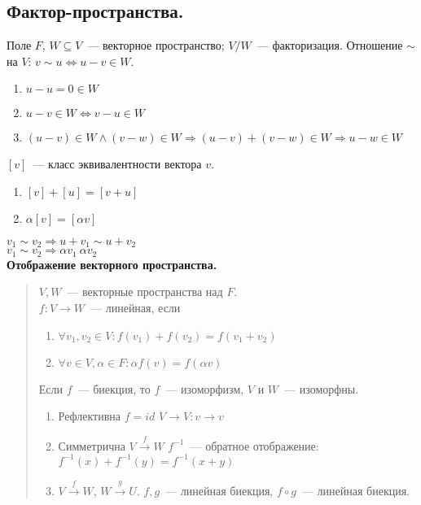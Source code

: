 \documentclass{article}
\begin{document}
	\subsection{Фактор-пространства.}
	\begin{definition}
		Поле $F$, $W \subseteq V$~--- векторное пространство; $V / W$~--- факторизация. Отношение $\sim$ на $V$: $v \sim u \Leftrightarrow u - v \in W$.
		\begin{enumerate}
			\item $u - u = 0 \in W$
			\item $u - v \in W \Leftrightarrow v - u \in W$
			\item $(u - v) \in W \wedge (v - w) \in W \Rightarrow (u - v) + (v - w) \in W \Rightarrow u - w \in W$
		\end{enumerate}
	\end{definition}
	\noindent
	$[v]$~--- класс эквивалентности вектора $v$.
	\begin{enumerate}
		\item $[v] + [u] = [v + u]$
		\item $\alpha [v] = [\alpha v]$
	\end{enumerate}
	$v_1 \sim v_2 \Rightarrow u + v_1 \sim u + v_2$ \\
	$v_1 \sim v_2 \Rightarrow \alpha v_1 ~ \alpha v_2$ \\
	\textbf{Отображение векторного пространства.}
	\begin{quote}
		$V, W$~--- векторные пространства над $F$. \\
		$f: V \rightarrow W$~--- линейная, если
		\begin{enumerate}
			\item $\forall v_1, v_2 \in V: f(v_1) + f(v_2) = f(v_1 + v_2)$
			\item $\forall v \in V, \alpha \in F: \alpha f(v) = f(\alpha v)$
		\end{enumerate}
		Если $f$~--- биекция, то $f$~--- изоморфизм, $V$ и $W$~--- изоморфны.
		\begin{enumerate}
			\item Рефлективна $f = id$ $V \rightarrow V: v \rightarrow v$
			\item Симметрична $V \xrightarrow{f} W$ $f^{-1}$~--- обратное отображение: $f^{-1}(x) + f^{-1}(y) = f^{-1}(x + y)$
			\item $V \xrightarrow{f} W$, $W \xrightarrow{g} U$. $f, g$~--- линейная биекция, $f \circ g$~--- линейная биекция.
		\end{enumerate}
	\end{quote}
\end{document}

